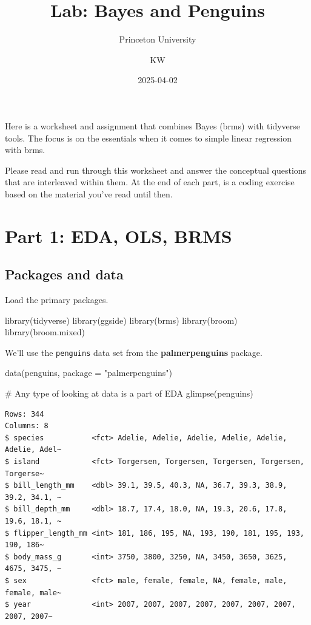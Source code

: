 \documentclass[
  letterpaper,
  DIV=11,
  numbers=noendperiod]{scrartcl}
\title{Lab: Bayes and Penguins}
\subtitle{Princeton University}
\author{KW}
\date{2025-04-02}
\newenvironment{Shaded}{\begin{snugshade}}{\end{snugshade}}
\newcommand{\AttributeTok}[1]{\textcolor[rgb]{0.40,0.45,0.13}{#1}}
\newcommand{\CommentTok}[1]{\textcolor[rgb]{0.37,0.37,0.37}{#1}}
\newcommand{\FunctionTok}[1]{\textcolor[rgb]{0.28,0.35,0.67}{#1}}
\newcommand{\NormalTok}[1]{\textcolor[rgb]{0.00,0.23,0.31}{#1}}
\newcommand{\StringTok}[1]{\textcolor[rgb]{0.13,0.47,0.30}{#1}}
\begin{document}
\maketitle

Here is a worksheet and assignment that combines Bayes (brms) with
tidyverse tools. The focus is on the essentials when it comes to simple
linear regression with brms.

Please read and run through this worksheet and answer the conceptual
questions that are interleaved within them. At the end of each part, is
a coding exercise based on the material you've read until then.

\section{Part 1: EDA, OLS, BRMS}\label{part-1-eda-ols-brms}

\subsection{Packages and data}\label{packages-and-data}

Load the primary packages.

\begin{Shaded}
\begin{Highlighting}[]
\FunctionTok{library}\NormalTok{(tidyverse)}
\FunctionTok{library}\NormalTok{(ggside)}
\FunctionTok{library}\NormalTok{(brms)}
\FunctionTok{library}\NormalTok{(broom)}
\FunctionTok{library}\NormalTok{(broom.mixed)}
\end{Highlighting}
\end{Shaded}

We'll use the \texttt{penguins} data set from the
\textbf{palmerpenguins} package.

\begin{Shaded}
\begin{Highlighting}[]
\FunctionTok{data}\NormalTok{(penguins, }\AttributeTok{package =} \StringTok{"palmerpenguins"}\NormalTok{)}

\CommentTok{\# Any type of looking at data is a part of EDA }
\FunctionTok{glimpse}\NormalTok{(penguins)}
\end{Highlighting}
\end{Shaded}

\begin{verbatim}
Rows: 344
Columns: 8
$ species           <fct> Adelie, Adelie, Adelie, Adelie, Adelie, Adelie, Adel~
$ island            <fct> Torgersen, Torgersen, Torgersen, Torgersen, Torgerse~
$ bill_length_mm    <dbl> 39.1, 39.5, 40.3, NA, 36.7, 39.3, 38.9, 39.2, 34.1, ~
$ bill_depth_mm     <dbl> 18.7, 17.4, 18.0, NA, 19.3, 20.6, 17.8, 19.6, 18.1, ~
$ flipper_length_mm <int> 181, 186, 195, NA, 193, 190, 181, 195, 193, 190, 186~
$ body_mass_g       <int> 3750, 3800, 3250, NA, 3450, 3650, 3625, 4675, 3475, ~
$ sex               <fct> male, female, female, NA, female, male, female, male~
$ year              <int> 2007, 2007, 2007, 2007, 2007, 2007, 2007, 2007, 2007~
\end{verbatim}
\end{document}
